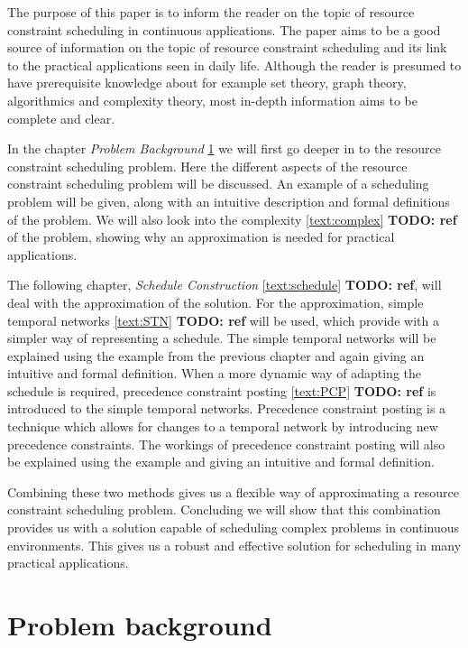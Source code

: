 \documentclass{article}
\theoremstyle{definition}
\newcommand{\TODO}[1]{{\color{red}\textbf{TODO: #1}}}
\begin{document}
The purpose of this paper is to inform the reader on the topic of resource constraint scheduling in continuous applications.
The paper aims to be a good source of information on the topic of resource constraint scheduling and its link to the practical applications seen in daily life.
Although the reader is presumed to have prerequisite knowledge about for example set theory, graph theory, algorithmics and complexity theory, most in-depth information aims to be complete and clear.

In the chapter \emph{Problem Background} \ref{text:problem_background} we will first go deeper in to the resource constraint scheduling problem.
Here the different aspects of the resource constraint scheduling problem will be discussed.
An example of a scheduling problem will be given, along with an intuitive description and formal definitions of the problem.
We will also look into the complexity \ref{text:complex} \TODO{ref} of the problem, showing why an approximation is needed for practical applications.

The following chapter, \emph{Schedule Construction} \ref{text:schedule} \TODO{ref}, will deal with the approximation of the solution.
For the approximation, simple temporal networks \ref{text:STN} \TODO{ref} will be used, which provide with a simpler way of representing a schedule.
The simple temporal networks will be explained using the example from the previous chapter and again giving an intuitive and formal definition.
When a more dynamic way of adapting the schedule is required, precedence constraint posting \ref{text:PCP} \TODO{ref} is introduced to the simple temporal networks.
Precedence constraint posting is a technique which allows for changes to a temporal network by introducing new precedence constraints.
The workings of precedence constraint posting will also be explained using the example and giving an intuitive and formal definition.

Combining these two methods gives us a flexible way of approximating a resource constraint scheduling problem.
Concluding we will show that this combination provides us with a solution capable of scheduling complex problems in continuous environments.
This gives us a robust and effective solution for scheduling in many practical applications.


\newpage


\section{Problem background}
\label{text:problem_background}
\end{document}
